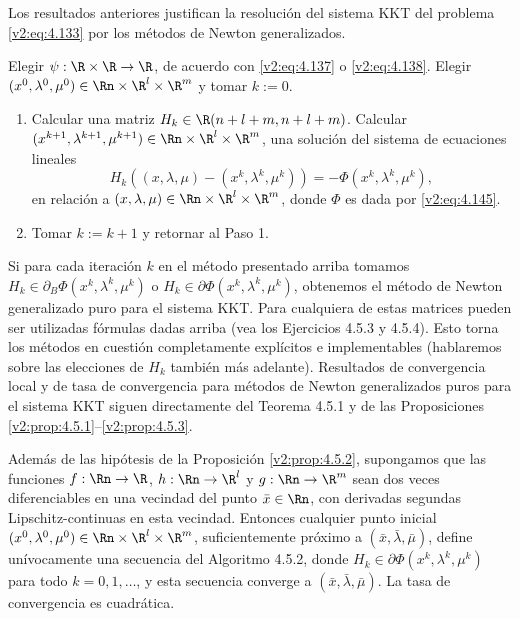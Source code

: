 Los resultados anteriores justifican la resolución del sistema KKT del problema \eqref{v2:eq:4.133} por los métodos de Newton generalizados.

\begin{algorithm}
    Elegir $\psi : \R \times \R \to \R$, de acuerdo con \eqref{v2:eq:4.137} o \eqref{v2:eq:4.138}. Elegir $(x^0, \lambda^0, \mu^0) \in \Rn \times \R^l \times \R^m$ y tomar $k:=0$.
\begin{enumerate}
    \item Calcular una matriz $H_k \in \R(n+l+m, n+l+m)$.
    Calcular $(x^{k+1}, \lambda^{k+1}, \mu^{k+1}) \in \Rn \times \R^l \times \R^m$, una solución del sistema de ecuaciones lineales
    \[
        H_k ((x, \lambda, \mu) - (x^k, \lambda^k, \mu^k)) = -\Phi(x^k, \lambda^k, \mu^k),
    \]
    en relación a $(x, \lambda, \mu) \in \Rn \times \R^l \times \R^m$, donde $\Phi$ es dada por \eqref{v2:eq:4.145}.
    \item Tomar $k:=k+1$ y retornar al Paso 1.
\end{enumerate}
    \end{algorithm}

Si para cada iteración $k$ en el método presentado arriba tomamos $H_k \in \partial_B \Phi(x^k, \lambda^k, \mu^k)$ o $H_k \in \partial \Phi(x^k, \lambda^k, \mu^k)$, obtenemos el método de Newton generalizado puro para el sistema KKT. Para cualquiera de estas matrices pueden ser utilizadas fórmulas dadas arriba (vea los Ejercicios 4.5.3 y 4.5.4). Esto torna los métodos en cuestión completamente explícitos e implementables (hablaremos sobre las elecciones de $H_k$ también más adelante). Resultados de convergencia local y de tasa de convergencia para métodos de Newton generalizados puros para el sistema KKT siguen directamente del Teorema 4.5.1 y de las Proposiciones \ref{v2:prop:4.5.1}--\ref{v2:prop:4.5.3}.

\begin{theorem}\label{v2:thm:4.5.2}
    Además de las hipótesis de la Proposición \ref{v2:prop:4.5.2}, supongamos que las funciones $f : \Rn \to \R$, $h : \Rn \to \R^l$ y $g : \Rn \to \R^m$ sean dos veces diferenciables en una vecindad del punto $\bar{x} \in \Rn$, con derivadas segundas Lipschitz-continuas en esta vecindad.
    Entonces cualquier punto inicial $(x^0, \lambda^0, \mu^0) \in \Rn \times \R^l \times \R^m$, suficientemente próximo a $(\bar{x}, \bar{\lambda}, \bar{\mu})$, define unívocamente una secuencia del Algoritmo 4.5.2, donde $H_k \in \partial \Phi(x^k, \lambda^k, \mu^k)$ para todo $k = 0, 1, \dots$, y esta secuencia converge a $(\bar{x}, \bar{\lambda}, \bar{\mu})$. La tasa de convergencia es cuadrática.
\end{theorem}

